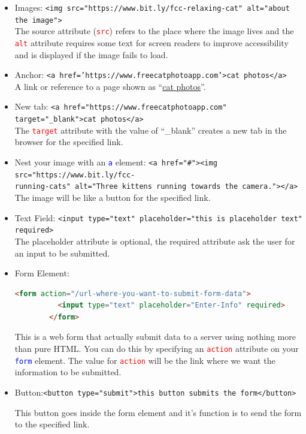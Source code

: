 \documentclass{article}
\begin{document}
    \begin{itemize}
    	\item Images: {\tt <img src="https://www.bit.ly/fcc-relaxing-cat" alt="about the image">}\\
    	
    	The source attribute (\textcolor{red}{{\tt src}}) refers to the place where the image lives and the \textcolor{red}{{\tt alt}} attribute requires some text for screen readers to improve accessibility and is displayed if the image fails to load.
    	
    	\item Anchor: {\tt <a href='https://www.freecatphotoapp.com'>cat photos</a>}\\
    	
    	A link or reference to a page shown as ``\underline{cat photos}''.
    	
    	\item New tab: {\tt <a href="https://www.freecatphotoapp.com" target="\_blank">cat photos</a>}\\
    	
    	The \textcolor{red}{{\tt target}} attribute with the value of ``\_blank'' creates a new tab in the browser for the specified link.
    	
    	\item Nest your image with an \textcolor{blue}{{\tt a}} element: {\tt <a href="\#"><img src="https://www.bit.ly/fcc-\\running-cats" alt="Three kittens running towards the camera."></a>}\\
    	
    	The image will be like a button for the specified link.
    	
    	\item Text Field: {\tt <input type="text" placeholder="this is placeholder text" required>
    	}\\
    
        The placeholder attribute is optional, the required attribute ask the user for an input to be submitted.
        
        \item Form Element:
    \begin{lstlisting}[language=html]
    	<form action="/url-where-you-want-to-submit-form-data">
    	  <input type="text" placeholder="Enter-Info" required>
    	</form>
    \end{lstlisting}
    
    This is a web form that actually submit data to a server using nothing more than pure HTML. You can do this by specifying an \textcolor{red}{{\tt action}} attribute on your \textcolor{blue}{{\tt form}} element. The value for \textcolor{red}{{\tt action}} will be the link where we want the information to be submitted.
    
    \item Button:{\tt <button type="submit">this button submits the form</button>}
    
    This button goes inside the form element and it's function is to send the form to the specified link.
    
    
    \end{itemize}
\end{document}
